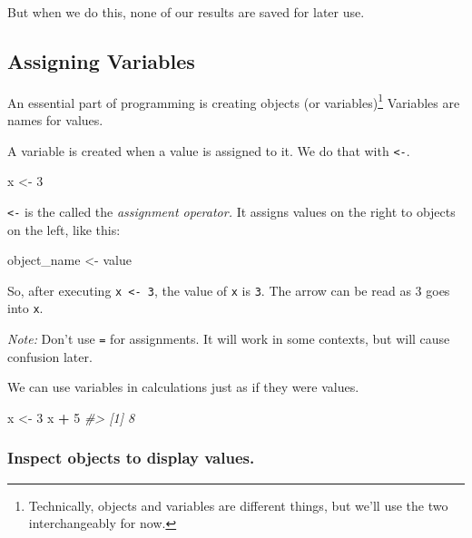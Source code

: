 \documentclass[]{book}
\newenvironment{Shaded}{\begin{snugshade}}{\end{snugshade}}
\newcommand{\DecValTok}[1]{\textcolor[rgb]{0.00,0.00,0.81}{#1}}
\newcommand{\StringTok}[1]{\textcolor[rgb]{0.31,0.60,0.02}{#1}}
\newcommand{\CommentTok}[1]{\textcolor[rgb]{0.56,0.35,0.01}{\textit{#1}}}
\newcommand{\OperatorTok}[1]{\textcolor[rgb]{0.81,0.36,0.00}{\textbf{#1}}}
\newcommand{\NormalTok}[1]{#1}
\let\rmarkdownfootnote\footnote%
\def\footnote{\protect\rmarkdownfootnote}
\begin{document}
But when we do this, none of our results are saved for later use.

\subsection{Assigning Variables}\label{assigning-variables}

An essential part of programming is creating objects (or
variables)\footnote{Technically, objects and variables are different
  things, but we'll use the two interchangeably for now.} Variables are
names for values.

A variable is created when a value is assigned to it. We do that with
\texttt{\textless{}-}.

\begin{Shaded}
\begin{Highlighting}[]
\NormalTok{x <-}\StringTok{ }\DecValTok{3}
\end{Highlighting}
\end{Shaded}

\texttt{\textless{}-} is the called the \emph{assignment operator.} It
assigns values on the right to objects on the left, like this:

\begin{Shaded}
\begin{Highlighting}[]
\NormalTok{object_name <-}\StringTok{ }\NormalTok{value}
\end{Highlighting}
\end{Shaded}

So, after executing \texttt{x\ \textless{}-\ 3}, the value of \texttt{x}
is \texttt{3}. The arrow can be read as 3 goes into \texttt{x}.

\emph{Note:} Don't use \texttt{=} for assignments. It will work in some
contexts, but will cause confusion later.

We can use variables in calculations just as if they were values.

\begin{Shaded}
\begin{Highlighting}[]
\NormalTok{x <-}\StringTok{ }\DecValTok{3}
\NormalTok{x }\OperatorTok{+}\StringTok{ }\DecValTok{5}
\CommentTok{#> [1] 8}
\end{Highlighting}
\end{Shaded}

\subsubsection*{Inspect objects to display
values.}\label{inspect-objects-to-display-values.}
\end{document}
